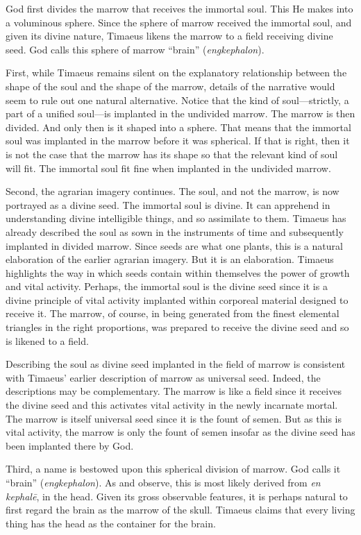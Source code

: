 God first divides the marrow that receives the immortal soul. This He makes into a voluminous sphere. Since the sphere of marrow received the immortal soul, and given its divine nature, Timaeus likens the marrow to a field receiving divine seed. God calls this sphere of marrow ``brain'' (\emph{engkephalon}).

First, while Timaeus remains silent on the explanatory relationship between the shape of the soul and the shape of the marrow, details of the narrative would seem to rule out one natural alternative. Notice that the kind of soul---strictly, a part of a unified soul---is implanted in the undivided marrow. The marrow is then divided. And only then is it shaped into a sphere. That means that the immortal soul was implanted in the marrow before it was spherical. If that is right, then it is not the case that the marrow has its shape so that the relevant kind of soul will fit. The immortal soul fit fine when implanted in the undivided marrow.

Second, the agrarian imagery continues. The soul, and not the marrow, is now portrayed as a divine seed. The immortal soul is divine. It can apprehend in understanding divine intelligible things, and so assimilate to them. Timaeus has already described the soul as sown in the instruments of time and subsequently implanted in divided marrow. Since seeds are what one plants, this is a natural elaboration of the earlier agrarian imagery. But it is an elaboration. Timaeus highlights the way in which seeds contain within themselves the power of growth and vital activity. Perhaps, the immortal soul is the divine seed since it is a divine principle of vital activity implanted within corporeal material designed to receive it. The marrow, of course, in being generated from the finest elemental triangles in the right proportions, was prepared to receive the divine seed and so is likened to a field.

Describing the soul as divine seed implanted in the field of marrow is consistent with Timaeus' earlier description of marrow as universal seed. Indeed, the descriptions may be complementary. The marrow is like a field since it receives the divine seed and this activates vital activity in the newly incarnate mortal. The marrow is itself universal seed since it is the fount of semen. But as this is vital activity, the marrow is only the fount of semen insofar as the divine seed has been implanted there by God.

Third, a name is bestowed upon this spherical division of marrow. God calls it ``brain''  (\emph{engkephalon}). As \citet[77 n2]{Taylor:1929ov} and \citet[293 n3]{Cornford:1935fk} observe, this is most likely derived from \emph{en kephalē}, in the head. Given its gross observable features, it is perhaps natural to first regard the brain as the marrow of the skull. Timaeus claims that every living thing has the head as the container for the brain.

